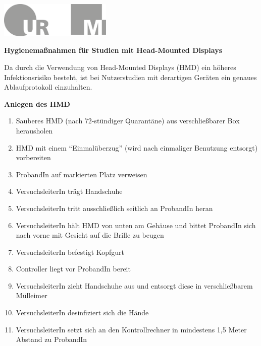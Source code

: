 \documentclass[24pt, a4paper, portrait]{article}
\begin{document}
\pagestyle{empty}

\raggedleft

\includegraphics[width=0.4\textwidth]{logo}

\vspace{1cm}
\sffamily
\centering
\huge

\textbf{Hygienemaßnahmen für Studien mit Head-Mounted Displays}

\vspace{1cm}

\raggedright
\Large

Da durch die Verwendung von Head-Mounted Displays (HMD) ein höheres Infektionsrisiko besteht, ist bei Nutzerstudien mit derartigen Geräten ein genaues Ablaufprotokoll einzuhalten.

\vspace{0.5cm}

\textbf{Anlegen des HMD}

\large

\begin{enumerate}
    \item Sauberes HMD (nach 72-stündiger Quarantäne) aus verschließbarer Box herausholen
    \item HMD mit einem “Einmalüberzug” (wird nach einmaliger Benutzung entsorgt) vorbereiten
    \item ProbandIn auf markierten Platz verweisen 
    \item VersuchsleiterIn trägt Handschuhe
    \item VersuchsleiterIn tritt ausschließlich seitlich an ProbandIn heran
    \item VersuchsleiterIn hält HMD von unten am Gehäuse und bittet ProbandIn sich nach vorne mit Gesicht auf die Brille zu beugen 
    \item VersuchsleiterIn befestigt Kopfgurt 
    \item Controller liegt vor ProbandIn bereit 
    \item VersuchsleiterIn zieht Handschuhe aus und entsorgt diese in verschließbarem Mülleimer
    \item VersuchsleiterIn desinfiziert sich die Hände
    \item VersuchsleiterIn setzt sich an den Kontrollrechner in mindestens 1,5 Meter Abstand zu ProbandIn
\end{enumerate}
\end{document}
